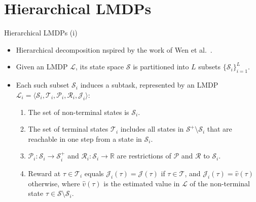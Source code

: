 \documentclass{beamer}
\theoremstyle{mystyle}
\newcommand{\cJ}{\mathcal{J}}
\newcommand{\cL}{\mathcal{L}}
\newcommand{\cP}{\mathcal{P}}
\newcommand{\cR}{\mathcal{R}}
\newcommand{\cS}{\mathcal{S}}
\newcommand{\cT}{\mathcal{T}}
\newcommand{\real}{\mathbb{R}}
\begin{document}
\section{Hierarchical LMDPs}
\begin{frame}{Hierarchical LMDPs (i)}

    \begin{itemize}
        \item Hierarchical decomposition nspired by the work of Wen et al.~\cite{conf/nips/Wen20}. 
        \item Given an LMDP $\cL$, its state space $\cS$ is partitioned into $L$ subsets $\{\cS_i\}_{i=1}^L$. 
        \item Each such subset $\cS_i$ induces a subtask, represented by an LMDP $\cL_i=\langle\cS_i,\cT_i,\cP_i,\cR_i,\cJ_i\rangle$:
        \begin{enumerate}
        \item The set of non-terminal states is $\cS_i$.
        \item The set of terminal states $\cT_i$ includes all states in $\cS^+\setminus\cS_i$ that are reachable in one step from a state in $\cS_i$.
        \item $\cP_i:\cS_i\rightarrow\cS_i^+$ and $\cR_i:\cS_i\rightarrow\real$ are restrictions of $\cP$ and $\cR$ to $\cS_i$.
        \item Reward at $\tau\in\cT_i$ equals $\cJ_i(\tau)=\cJ(\tau)$ if $\tau\in\cT$, and $\cJ_i(\tau)=\hat{v}(\tau)$ otherwise, where $\hat{v}(\tau)$ is the estimated value in $\cL$ of the non-terminal state $\tau\in\cS \setminus \cS_i$.
        \end{enumerate}
        
\end{itemize}

\end{frame}
\end{document}

